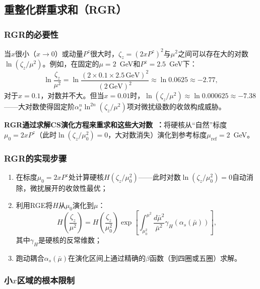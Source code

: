 \documentclass[12pt,a4paper]{ctexart}
\theoremstyle{definition}
\begin{document}
\subsection{重整化群重求和（RGR）}

\subsubsection{RGR的必要性}

当$x$很小（$x \to 0$）或动量$P^z$很大时，$\zeta_z = (2xP^z)^2$与$\mu^2$之间可以存在大的对数$\ln(\zeta_z/\mu^2)$。例如，在固定的$\mu = 2$~GeV和$P^z = 2.5$~GeV下：
\begin{equation}
\ln\frac{\zeta_z}{\mu^2} = \ln\frac{(2 \times 0.1 \times 2.5\,\text{GeV})^2}{(2\,\text{GeV})^2} \approx \ln 0.0625 \approx -2.77,
\end{equation}
对于$x=0.1$，对数并不大。但当$x=0.01$时，$\ln(\zeta_z/\mu^2) \approx \ln 0.000625 \approx -7.38$——大对数使得固定阶$\alpha_s^n \ln^{2n}(\zeta_z/\mu^2)$项对微扰级数的收敛构成威胁。

\textbf{RGR通过求解CS演化方程来重求和这些大对数~\cite{He2024unpolTMD}：}将硬核从``自然''标度$\mu_0 = 2xP^z$（此时$\ln(\zeta_z/\mu_0^2) = 0$，大对数消失）演化到参考标度$\mu_{\text{ref}} = 2$~GeV。

\subsubsection{RGR的实现步骤}

\begin{enumerate}
    \item 在标度$\mu_0 = 2xP^z$处计算硬核$H(\zeta_z/\mu_0^2)$——此时对数$\ln(\zeta_z/\mu_0^2) = 0$自动消除，微扰展开的收敛性最优；
    \item 利用RGE将$H$从$\mu_0$演化到$\mu$：
    \begin{equation}
    H\!\left(\frac{\zeta_z}{\mu^2}\right) = H\!\left(\frac{\zeta_z}{\mu_0^2}\right) \exp\!\left[ \int_{\mu_0^2}^{\mu^2} \frac{d\bar{\mu}^2}{\bar{\mu}^2} \gamma_H(\alpha_s(\bar{\mu})) \right],
    \end{equation}
    其中$\gamma_H$是硬核的反常维数；
    \item 跑动耦合$\alpha_s(\bar{\mu})$在演化区间上通过精确的$\beta$函数（到四圈或五圈）求解。
\end{enumerate}

\subsubsection{小$x$区域的根本限制}
\end{document}
